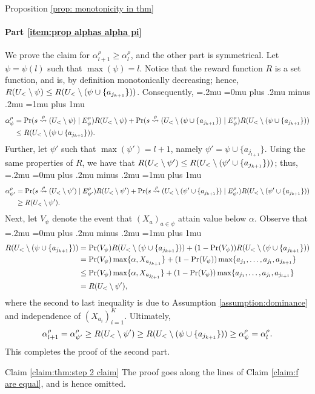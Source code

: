 \begin{proofof}{Proposition \ref{prop: monotonicity in thm}}
\paragraph{Part \ref{item:prop alphas alpha pi}} We prove the claim for $\alpha^\rho_{l+1} \geq \alpha^\rho_{l}$, and the other part is symmetrical. Let $\psi=\psi(l)$ such that $\max(\psi)=l$. Notice that the reward function $R$ is a set function, and is, by definition monotonically decreasing; hence, $R(U_<\setminus \psi) \leq R(U_<\setminus (\psi \cup \{a_{j_{k+1}}\}))$. Consequently,
{\thinmuskip=.2mu
\medmuskip=0mu plus .2mu minus .2mu
\thickmuskip=1mu plus 1mu
\begin{align*}
\alpha^\rho_\psi&=\Pr(s\stackrel{\rho}{\rightsquigarrow}(U_<\setminus \psi)\mid E^\rho_\psi)R(U_<\setminus \psi)+\Pr(s\stackrel{\rho}{\rightsquigarrow}(U_<\setminus (\psi \cup \{a_{j_{k+1}}\})\mid E^\rho_\psi)R(U_<\setminus (\psi \cup \{a_{j_{k+1}}\}))\nonumber\\
&\leq R(U_<\setminus (\psi \cup \{a_{j_{k+1}}\})).
\end{align*}}%
Further, let $\psi'$ such that $\max(\psi')=l+1$, namely $\psi'=\psi\cup\{a_{j_{l+1}} \}$. Using the same properties of $R$, we have that $R(U_<\setminus \psi') \leq R(U_<\setminus (\psi' \cup \{a_{j_{k+1}}\}))$; thus,
{\thinmuskip=.2mu
\medmuskip=0mu plus .2mu minus .2mu
\thickmuskip=1mu plus 1mu
\begin{align*}
\alpha^\rho_{\psi'}&=\Pr(s\stackrel{\rho}{\rightsquigarrow}(U_<\setminus \psi')\mid E^\rho_{\psi'})R(U_<\setminus \psi')+\Pr(s\stackrel{\rho}{\rightsquigarrow}(U_<\setminus (\psi' \cup \{a_{j_{k+1}}\})\mid E^\rho_{\psi'})R(U_<\setminus (\psi' \cup \{a_{j_{k+1}}\}))\nonumber\\
&\geq R(U_<\setminus \psi' ).
\end{align*}}%
Next, let $V_\psi$ denote the event that $(X_{a})_{a\in \psi}$ attain value below $\alpha$. Observe that 
{\thinmuskip=.2mu
\medmuskip=0mu plus .2mu minus .2mu
\thickmuskip=1mu plus 1mu
\begin{align*}
R(U_<\setminus (\psi \cup \{a_{j_{k+1}}\})) &=\Pr(V_\psi)R(U_<\setminus (\psi \cup \{a_{j_{k+1}}\}))+(1-\Pr(V_\psi))R(U_<\setminus (\psi \cup \{a_{j_{k+1}}\}))\nonumber\\
&=\Pr(V_\psi)\max\{\alpha,X_{a_{j_{k+1}}}\}+(1-\Pr(V_\psi))\max\{a_{j_1},\dots ,a_{j_l},a_{j_{k+1}}  \}\nonumber\\
&\leq \Pr(V_\psi)\max\{\alpha,X_{a_{j_{l+1}}}\}+(1-\Pr(V_\psi))\max\{a_{j_1},\dots ,a_{j_l},a_{j_{l+1}}  \}\\
&=R(U_<\setminus \psi' ) ,
\end{align*}}%
where the second to last inequality is due to Assumption \ref{assumption:dominance} and independence of $(X_{a_i})_{i=1}^K$. Ultimately, 
\[
\alpha^\rho_{l+1}=\alpha^\rho_{\psi'} \geq R(U_<\setminus \psi' ) \geq R(U_<\setminus (\psi \cup \{a_{j_{k+1}}\})) \geq \alpha^\rho_{\psi}=\alpha^\rho_{l}.
\]
This completes the proof of the second part.
\end{proofof}

\begin{proofof}{Claim \ref{claim:thm:step 2 claim}}
The proof goes along the lines of Claim \ref{claim:f are equal}, and is hence omitted.
\end{proofof}
